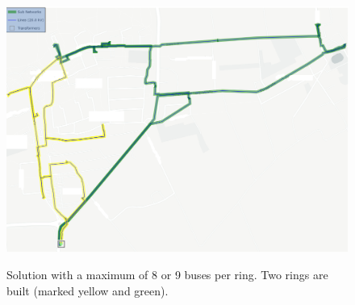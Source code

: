 \begin{figure}[h]
	\begin{centering}
		{\includegraphics[scale=0.3]{figures/experiments/ringsize/ringsize89_2.png}}
		\caption[Appendix: Max. 8/9 buses per ring]{Solution with a maximum of 8 or 9 buses per ring. Two rings are built (marked yellow and green).}
		\label{fig:ringsize89_2}
	\end{centering}
\end{figure}
